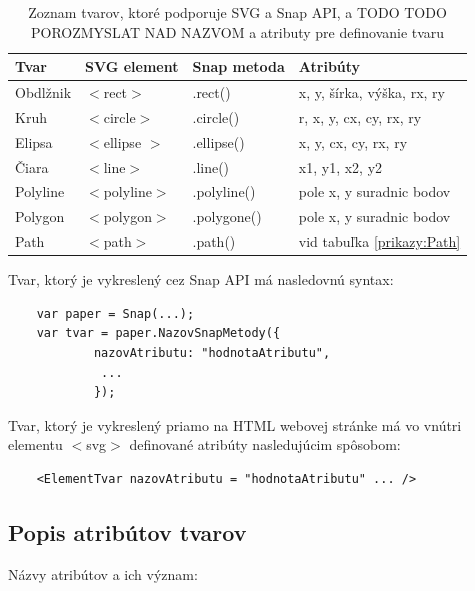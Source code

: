 \begin{table}[hp]
	\begin{center}
		\begin{tabular}{|l|l|l|l|}
		\hline \textbf{Tvar} & \textbf{SVG element} & \textbf{Snap metoda} & \textbf{Atribúty} \\ 
		\hline Obdlžnik & $<$rect$>$ & .rect() & x, y, šírka, výška, rx, ry \\ 
		\hline Kruh & $<$circle$>$ & .circle() & r, x, y, cx, cy, rx, ry \\ 
		\hline Elipsa & $<$ellipse $>$ & .ellipse() & x, y, cx, cy, rx, ry \\ 
		\hline Čiara & $<$line$>$ & .line() & x1, y1, x2, y2 \\ 
		\hline Polyline & $<$polyline$>$ & .polyline() & pole x, y suradnic bodov \\ 
		\hline Polygon & $<$polygon$>$ & .polygone() & pole x, y suradnic bodov \\ 
		\hline Path & $<$path$>$ & .path() & vid tabuľka \ref{prikazy:Path}  \\ 
		\hline 
	\end{tabular} 
	
	\end{center}
	
	\label{porovnanieSVG:Snap}
	\caption{Zoznam tvarov, ktoré podporuje SVG a Snap API, a TODO TODO POROZMYSLAT NAD NAZVOM a atributy pre definovanie tvaru}
\end{table}




Tvar, ktorý je vykreslený cez Snap API má nasledovnú syntax: 

\begin{lstlisting}
	var paper = Snap(...);
	var tvar = paper.NazovSnapMetody({
			nazovAtributu: "hodnotaAtributu",
			 ...
			});
\end{lstlisting}

Tvar, ktorý je vykreslený priamo na HTML webovej stránke má vo vnútri elementu $<$svg$>$ definované atribúty nasledujúcim spôsobom: 

\begin{lstlisting}
	<ElementTvar nazovAtributu = "hodnotaAtributu" ... />
\end{lstlisting}


\subsection{Popis atribútov tvarov}

Názvy atribútov a ich význam: 

